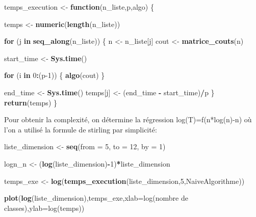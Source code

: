 \documentclass[
]{article}
\newenvironment{Shaded}{\begin{snugshade}}{\end{snugshade}}
\newcommand{\AttributeTok}[1]{\textcolor[rgb]{0.13,0.29,0.53}{#1}}
\newcommand{\ControlFlowTok}[1]{\textcolor[rgb]{0.13,0.29,0.53}{\textbf{#1}}}
\newcommand{\DecValTok}[1]{\textcolor[rgb]{0.00,0.00,0.81}{#1}}
\newcommand{\FunctionTok}[1]{\textcolor[rgb]{0.13,0.29,0.53}{\textbf{#1}}}
\newcommand{\NormalTok}[1]{#1}
\newcommand{\OtherTok}[1]{\textcolor[rgb]{0.56,0.35,0.01}{#1}}
\newcommand{\SpecialCharTok}[1]{\textcolor[rgb]{0.81,0.36,0.00}{\textbf{#1}}}
\newcommand{\StringTok}[1]{\textcolor[rgb]{0.31,0.60,0.02}{#1}}
\begin{document}
\begin{Shaded}
\begin{Highlighting}[]
\NormalTok{temps\_execution }\OtherTok{\textless{}{-}} \ControlFlowTok{function}\NormalTok{(n\_liste,p,algo) \{}

\NormalTok{  temps }\OtherTok{\textless{}{-}} \FunctionTok{numeric}\NormalTok{(}\FunctionTok{length}\NormalTok{(n\_liste))}
  
  \ControlFlowTok{for}\NormalTok{ (j }\ControlFlowTok{in} \FunctionTok{seq\_along}\NormalTok{(n\_liste)) \{}
\NormalTok{    n }\OtherTok{\textless{}{-}}\NormalTok{ n\_liste[j]}
\NormalTok{    cout }\OtherTok{\textless{}{-}} \FunctionTok{matrice\_couts}\NormalTok{(n)}
    
\NormalTok{    start\_time }\OtherTok{\textless{}{-}} \FunctionTok{Sys.time}\NormalTok{()}
    
    \ControlFlowTok{for}\NormalTok{ (i }\ControlFlowTok{in} \DecValTok{0}\SpecialCharTok{:}\NormalTok{(p}\DecValTok{{-}1}\NormalTok{)) \{}
    \FunctionTok{algo}\NormalTok{(cout)}
\NormalTok{    \}}
    
\NormalTok{    end\_time }\OtherTok{\textless{}{-}} \FunctionTok{Sys.time}\NormalTok{()}
\NormalTok{    temps[j] }\OtherTok{\textless{}{-}}\NormalTok{ (end\_time }\SpecialCharTok{{-}}\NormalTok{ start\_time)}\SpecialCharTok{/}\NormalTok{p}
\NormalTok{  \}}
  \FunctionTok{return}\NormalTok{(temps)}
\NormalTok{\}}
\end{Highlighting}
\end{Shaded}

Pour obtenir la complexité, on détermine la régression
log(T)=f(n*log(n)-n) où l'on a utilisé la formule de stirling par
simplicité:

\begin{Shaded}
\begin{Highlighting}[]
\NormalTok{liste\_dimension }\OtherTok{\textless{}{-}} \FunctionTok{seq}\NormalTok{(}\AttributeTok{from =} \DecValTok{5}\NormalTok{, }\AttributeTok{to =} \DecValTok{12}\NormalTok{, }\AttributeTok{by =} \DecValTok{1}\NormalTok{)}

\NormalTok{logn\_n }\OtherTok{\textless{}{-}}\NormalTok{ (}\FunctionTok{log}\NormalTok{(liste\_dimension)}\SpecialCharTok{{-}}\DecValTok{1}\NormalTok{)}\SpecialCharTok{*}\NormalTok{liste\_dimension}

\NormalTok{temps\_exe }\OtherTok{\textless{}{-}} \FunctionTok{log}\NormalTok{(}\FunctionTok{temps\_execution}\NormalTok{(liste\_dimension,}\DecValTok{5}\NormalTok{,NaiveAlgorithme)) }

\FunctionTok{plot}\NormalTok{(}\FunctionTok{log}\NormalTok{(liste\_dimension),temps\_exe,}\AttributeTok{xlab=}\StringTok{\textquotesingle{}log(nombre de classes)\textquotesingle{}}\NormalTok{,}\AttributeTok{ylab=}\StringTok{\textquotesingle{}log(temps)\textquotesingle{}}\NormalTok{)}
\end{Highlighting}
\end{Shaded}
\end{document}
